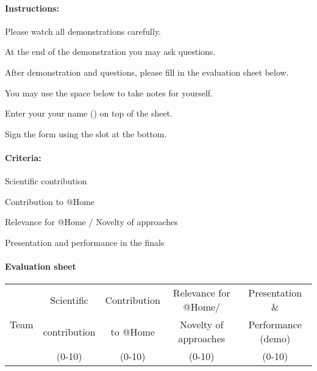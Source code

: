 \paragraph{Instructions:}
\begin{compactenum}
\item Please watch all demonstrations carefully.
\item At the end of the demonstration you may ask questions.
\item After demonstration and questions, please fill in the evaluation sheet below.
\item You may use the space below  to take notes for yourself.
\item Enter your your name () on top of the sheet.
\item Sign the form using the  slot at the bottom.
\end{compactenum}

\paragraph{Criteria:}
\begin{compactitem}
\item Scientific contribution
\item Contribution to @Home
\item Relevance for @Home / Novelty of approaches
\item Presentation and performance in the finals
\end{compactitem}



\paragraph{Evaluation sheet}
\begin{center}

\begingroup
\newcommand\tableTEAMS{}
\def\do#1{\appto\tableTEAMS{#1 & & & &  \\\hline}}%
\expandafter\docsvlist\expandafter{\TEAMSFINALS}

\begin{tabular}{|l|c|c|c|c|}
  \hline
  \multirow{3}{*}{Team}
  &  Scientific   & Contribution & Relevance for @Home/   &  Presentation \&  \\
  &  contribution & to @Home     & Novelty of approaches &  Performance (demo) \\
  &  (0-10)  &  (0-10) &  (0-10)   & (0-10) \\
  \hline
  \hline
  \tableTEAMS
\end{tabular}\\
\endgroup

\end{center}



